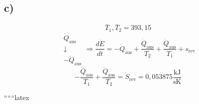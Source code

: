 

\subsection*{c)}
\[
\bar{T}_1, \bar{T}_2 = 393,15
\]
\[
\begin{array}{c}
\dot{Q}_{\text{aus}} \\
\downarrow \\
-\dot{Q}_{\text{aus}}
\end{array}
\Rightarrow \frac{d\dot{E}}{dt} = -\dot{Q}_{\text{aus}} + \frac{\dot{Q}_{\text{aus}}}{T_2} + \frac{\dot{Q}_{\text{aus}}}{T_1} + s_{\text{rev}}
\]
\[
-\frac{\dot{Q}_{\text{aus}}}{T_1} + \frac{\dot{Q}_{\text{aus}}}{T_2} = \dot{S}_{\text{rev}} = 0,053875 \frac{\text{kJ}}{\text{sK}}
\]

``````latex